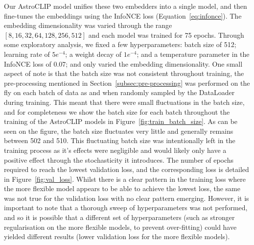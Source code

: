 Our AstroCLIP model unifies these two embedders into a single model, and then fine-tunes the embeddings using the InfoNCE loss
(Equation~\eqref{eq:infonce}).
The embedding dimensionality was varied through the range $[8, 16, 32, 64, 128, 256, 512]$ and each model was trained for
75 epochs.
Through some exploratory analysis, we fixed a few hyperparameters: batch size of 512; learning rate of $5e^{-4}$; a weight
decay of $1e^{-4}$; and a temperature parameter in the InfoNCE loss of 0.07; and only varied the embedding dimensionality.
One small aspect of note is that the batch size was not consistent throughout training, the pre-processing mentioned in
Section~\eqref{subsec:pre-processing} was performed on the fly on each batch of data as and when randomly sampled by
the DataLoader during training.
This meant that there were small fluctuations in the batch size, and for completeness we show the batch size for each batch
throughout the training of the AstroCLIP models in Figure~\eqref{fig:train_batch_size}.
As can be seen on the figure, the batch size fluctuates very little and generally remains between 502 and 510.
This fluctuating batch size was intentionally left in the training process as it's effects were negligible and would likely
only have a positive effect through the stochasticity it introduces.
The number of epochs required to reach the lowest validation loss, and the corresponding loss is detailed in Figure~\eqref{fig:val_loss}.
Whilst there is a clear pattern in the training loss where the more flexible model appears to be able to achieve the
lowest loss, the same was not true for the validation loss with no clear pattern emerging.
However, it is important to note that a thorough sweep of hyperparameters was not performed, and so it is possible that
a different set of hyperparameters (such as stronger regularisation on the more flexible models, to prevent over-fitting)
could have yielded different results (lower validation loss for the more flexible models).
